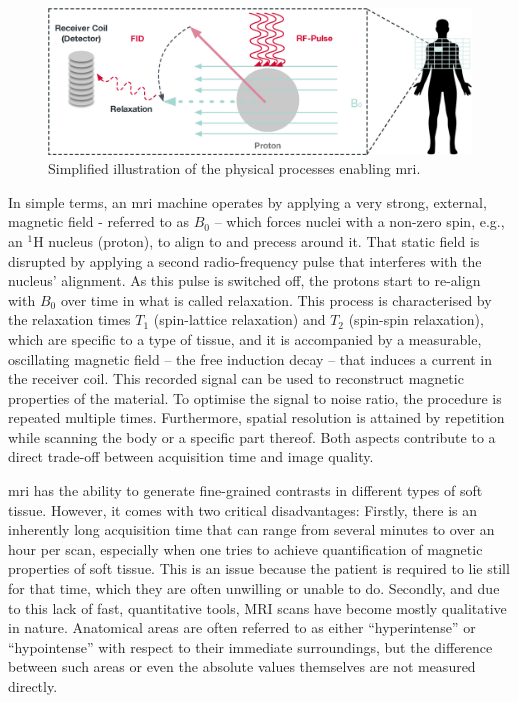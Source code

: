 \begin{figure}[b]
    \centering
    \includegraphics[width=\textwidth]{figures/mri.eps}
    \caption{Simplified illustration of the physical processes enabling \acrshort{mri}.}
    \label{figure:mri}
\end{figure}

In simple terms, an \acrshort{mri} machine operates by applying a very strong, external, magnetic field - referred to as $B_0$ -- which forces nuclei with a non-zero spin, e.g., an $^{1}\text{H}$ nucleus (proton), to align to and precess around it. That static field is disrupted by applying a second radio-frequency pulse that interferes with the nucleus' alignment. As this pulse is switched off, the protons start to re-align with $B_0$ over time in what is called relaxation. This process is characterised by the relaxation times $T_1$ (spin-lattice relaxation) and $T_2$ (spin-spin relaxation), which are specific to a type of tissue, and it is accompanied by a measurable, oscillating magnetic field -- the free induction decay --  that induces a current in the receiver coil. This recorded signal can be used to reconstruct magnetic properties of the material. To optimise the signal to noise ratio, the procedure is repeated multiple times. Furthermore, spatial resolution is attained by repetition while scanning the body or a specific part thereof. Both aspects contribute to a direct trade-off between acquisition time and image quality.

\acrshort{mri} has the ability to generate fine-grained contrasts in different types of soft tissue. However, it comes with two critical disadvantages: Firstly, there is an inherently long acquisition time that can range from several minutes to over an hour per scan, especially when one tries to achieve quantification of magnetic properties of soft tissue. This is an issue because the patient is required to lie still for that time, which they are often unwilling or unable to do. Secondly, and due to this lack of fast, quantitative tools, MRI scans have become mostly qualitative in nature. Anatomical areas are often referred to as either ``hyperintense'' or ``hypointense'' with respect to their immediate surroundings, but the difference between such areas or even the absolute values themselves are not measured directly.

